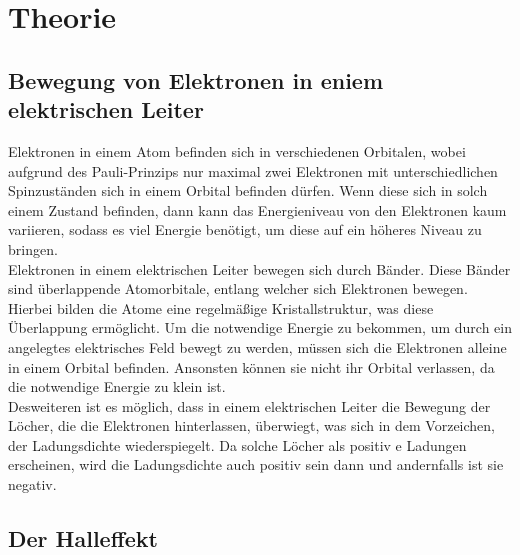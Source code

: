 \section{Theorie}
\label{sec:Theorie}

\subsection{Bewegung von Elektronen in eniem elektrischen Leiter}

\noindent Elektronen in einem Atom befinden sich in verschiedenen Orbitalen, wobei aufgrund des Pauli-Prinzips nur maximal
zwei Elektronen mit unterschiedlichen Spinzuständen sich in einem Orbital befinden dürfen. Wenn diese sich in solch
einem Zustand befinden, dann kann das Energieniveau von den Elektronen kaum variieren, sodass es viel Energie
benötigt, um diese auf ein höheres Niveau zu bringen. \\

\noindent Elektronen in einem elektrischen Leiter bewegen sich durch Bänder. Diese Bänder sind überlappende Atomorbitale,
entlang welcher sich Elektronen bewegen. Hierbei bilden die Atome eine regelmäßige Kristallstruktur, was diese 
Überlappung ermöglicht. Um die notwendige Energie zu bekommen, um durch ein angelegtes elektrisches
Feld bewegt zu werden, müssen sich die Elektronen alleine in einem Orbital befinden. Ansonsten können sie nicht
ihr Orbital verlassen, da die notwendige Energie zu klein ist. \\

\noindent Desweiteren ist es möglich, dass in einem elektrischen Leiter die Bewegung der Löcher, die die Elektronen 
hinterlassen, überwiegt, was sich in dem Vorzeichen, der Ladungsdichte wiederspiegelt. Da solche Löcher als positiv e
Ladungen erscheinen, wird die Ladungsdichte auch positiv sein dann und andernfalls ist sie negativ.

\subsection{Der Halleffekt}

